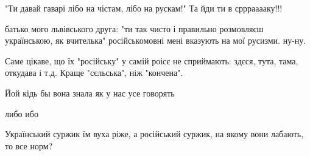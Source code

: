 \begin{itemize}
 
"Ти давай гаварі лібо на чістам, лібо на рускам!"
Та йди ти в срррааааку!!!

 
батько мого львівського друга: "ти так чисто і правильно розмовляєш українською, як вчителька"
російськомовні мені вказують на мої русизми. ну-ну.

 
Саме цікаве, що їх "російську" у самій роісє не сприймають: здєся, тута, тама, откудава і т.д. Краще "сєльська", ніж "кончена".

 
Йой кідь бы вона знала як у нас усе говорять

 
либо ибо

 
Український суржик їм вуха ріже, а російський суржик, на якому вони лабають, то все норм?

\begin{itemize}
 

\end{itemize}
\end{itemize}

